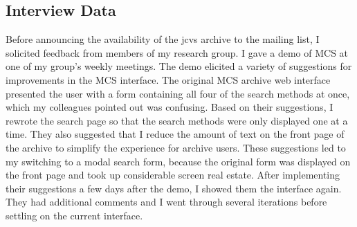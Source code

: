 \subsection{Interview Data}
\label{sec:interview-data}
Before announcing the availability of the jcvs archive to the mailing list, I
solicited feedback from members of my research group. I gave a demo of MCS at
one of my group's weekly meetings. The demo elicited a variety of suggestions
for improvements in the MCS interface. The original MCS archive web interface
presented the user with a form containing all four of the search methods at
once, which my colleagues pointed out was confusing. Based on their
suggestions, I rewrote the search page so that the search methods were only
displayed one at a time. They also suggested that I reduce the amount of text
on the front page of the archive to simplify the experience for archive users.
These suggestions led to my switching to a modal search form, because the
original form was displayed on the front page and took up considerable screen
real estate. After implementing their suggestions a few days after the demo, I
showed them the interface again. They had additional comments and I went
through several iterations before settling on the current interface.

